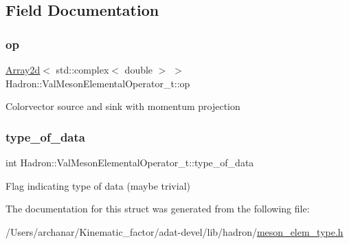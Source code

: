 \subsection{Field Documentation}
\mbox{\label{structHadron_1_1ValMesonElementalOperator__t_a4bee83a71ec09d6eea27bf327fe15742}} 
\subsubsection{\texorpdfstring{op}{op}}
{\footnotesize\ttfamily \mbox{\hyperlink{classXMLArray_1_1Array2d}{Array2d}}$<$ std\+::complex$<$ double $>$ $>$ Hadron\+::\+Val\+Meson\+Elemental\+Operator\+\_\+t\+::op}

Colorvector source and sink with momentum projection \mbox{\label{structHadron_1_1ValMesonElementalOperator__t_a6d4f446ccfc0b20cb30c9c37f424ddb6}} 
\subsubsection{\texorpdfstring{type\_of\_data}{type\_of\_data}}
{\footnotesize\ttfamily int Hadron\+::\+Val\+Meson\+Elemental\+Operator\+\_\+t\+::type\+\_\+of\+\_\+data}

Flag indicating type of data (maybe trivial) 

The documentation for this struct was generated from the following file\+:\begin{DoxyCompactItemize}
\item 
/\+Users/archanar/\+Kinematic\+\_\+factor/adat-\/devel/lib/hadron/\mbox{\hyperlink{adat-devel_2lib_2hadron_2meson__elem__type_8h}{meson\+\_\+elem\+\_\+type.\+h}}\end{DoxyCompactItemize}
